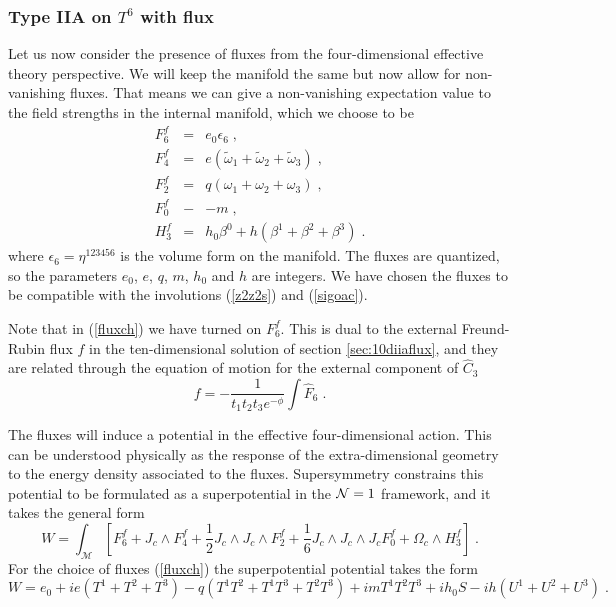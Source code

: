 \documentclass[11pt,a4paper]{article}
\numberwithin{equation}{section}
\numberwithin{table}{section}\setlength{\multlinegap}{25pt}
\newcommand{\bea}{\begin{eqnarray}}  \newcommand{\eea}{\end{eqnarray}}
\newcommand{\nn}{\nonumber}
\newcommand{\cM}{\mathcal M}
\newcommand{\be}{\begin{equation}}
\newcommand{\ee}{\end{equation}}
\begin{document}
\subsubsection{Type IIA on $T^6$ with flux}
\label{sec:iiat6flux} 

Let us now consider the presence of fluxes from the four-dimensional effective theory perspective. We will keep the manifold the same but now allow for non-vanishing fluxes. That means we can give a non-vanishing expectation value to the field strengths in the internal manifold, which we choose to be
\bea
F_6^f &=& e_0 \epsilon_6 \;, \nn \\
F_4^f &=& e \left( \tilde{\omega}_1 + \tilde{\omega}_2 + \tilde{\omega}_3 \right) \;, \nn \\
F_2^f &=& q \left( \omega_1 + \omega_2 + \omega_3 \right)\;, \nn \\
F_0^f &-& - m \;, \nn \\
H_3^f &=& h_0 \beta^0 + h \left(\beta^1 + \beta^2 + \beta^3 \right) \;.
\label{fluxch}
\eea
where $\epsilon_6 = \eta^{123456}$ is the volume form on the manifold. The fluxes are quantized, so the parameters $e_0$, $e$, $q$, $m$, $h_0$ and $h$ are integers. We have chosen the fluxes to be compatible with the involutions (\ref{z2z2s}) and (\ref{sigoac}). 

Note that in (\ref{fluxch}) we have turned on $F_6^f$. This is dual to the external Freund-Rubin flux $f$ in the ten-dimensional solution of section \ref{sec:10diiaflux}, and they are related through the equation of motion for the external component of $\hat{C}_3$
\be
\label{ftoF6}
f = - \frac{1}{t_1 t_2 t_3 e^{-\phi}} \int \hat{F}_6 \;.
\ee

The fluxes will induce a potential in the effective four-dimensional action. This can be understood physically as the response of the extra-dimensional geometry to the energy density associated to the fluxes. Supersymmetry constrains this potential to be formulated as a superpotential in the ${\cal N}=1$ framework, and it takes the general form \cite{Louis:2002ny,Grimm:2004ua}
\be
\label{fluxwnodj}
W = \int_\cM \left[ F^f_6 + J_c \wedge F^f_4 + \frac12 J_c \wedge J_c \wedge F^f_2 +  \frac16 J_c \wedge J_c \wedge J_c F^f_0 + \Omega_c \wedge H^f_3 \right] \;.
\ee
For the choice of fluxes (\ref{fluxch}) the superpotential potential takes the form
\be
W = e_0  + i e \left( T^1 + T^2 + T^3\right) - q \left( T^1 T^2 + T^1 T^3 + T^2 T^3\right)  + i m T^1 T^2 T^3 + i h_0 S - i h \left( U^1 + U^2 + U^3 \right) \;.
\label{wt6fl}
\ee
\end{document}
